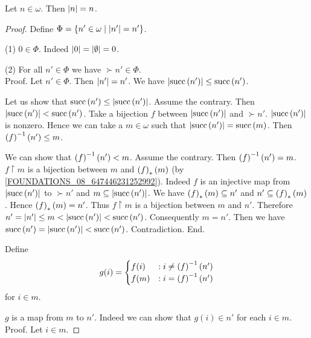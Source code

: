 \documentclass[../set-theory.tex]{subfiles}
\begin{document}
  \begin{forthel}
    \begin{theorem}
      Let $n \in \omega$.
      Then $\left\vert n\right\vert = n$.
    \end{theorem}
    \begin{proof}
      Define $\Phi = \{ n' \in \omega \mid \left\vert n'\right\vert = n' \}$.

      (1) $0 \in \Phi$.
      Indeed $\left\vert0\right\vert = \left\vert\emptyset\right\vert = 0$.

      (2) For all $n' \in \Phi$ we have $\succ{n'} \in \Phi$. \\
      Proof.
        Let $n' \in \Phi$.
        Then $\left\vert n'\right\vert = n'$.
        We have $\left\vert\mathrm{succ}\left(n'\right)\right\vert \leq \mathrm{succ}\left(n'\right)$.

        Let us show that $\mathrm{succ}\left(n'\right) \leq \left\vert\mathrm{succ}\left(n'\right)\right\vert$.
          Assume the contrary.
          Then $\left\vert\mathrm{succ}\left(n'\right)\right\vert < \mathrm{succ}\left(n'\right)$.
          Take a bijection $f$ between $\left\vert\mathrm{succ}\left(n'\right)\right\vert$ and $\succ{n'}$.
          $\left\vert\mathrm{succ}\left(n'\right)\right\vert$ is nonzero.
          Hence we can take a $m \in \omega$ such that $\left\vert\mathrm{succ}\left(n'\right)\right\vert =
          \mathrm{succ}\left(m\right)$.
          Then $\left(f\right)^{-1}(n') \leq m$.

          We can show that $\left(f\right)^{-1}(n') < m$.
            Assume the contrary.
            Then $\left(f\right)^{-1}(n') = m$.
            $f \restriction m$ is a bijection between $m$ and $\left(f\right)_{*}(m)$ (by
            \cref{FOUNDATIONS_08_647446231252992}).
            Indeed $f$ is an injective map from $\left\vert\mathrm{succ}\left(n'\right)\right\vert$ to $\succ{n'}$ and
            $m \subseteq \left\vert\mathrm{succ}\left(n'\right)\right\vert$.
            We have $\left(f\right)_{*}(m) \subseteq n'$ and $n' \subseteq \left(f\right)_{*}(m)$.
            Hence $\left(f\right)_{*}(m) = n'$.
            Thus $f \restriction m$ is a bijection between $m$ and $n'$.
            Therefore $n'
              = \left\vert n'\right\vert
              \leq m
              < \left\vert\mathrm{succ}\left(n'\right)\right\vert
              < \mathrm{succ}\left(n'\right)$.
            Consequently $m = n'$.
            Then we have $\mathrm{succ}\left(n'\right) = \left\vert\mathrm{succ}\left(n'\right)\right\vert < \mathrm{succ}\left(n'\right)$.
            Contradiction.
          End.

          Define \[ g(i) =
            \begin{cases}
              f(i)  & : i \neq \left(f\right)^{-1}(n')
              \\
              f(m)  & : i = \left(f\right)^{-1}(n')
            \end{cases} \]
          for $i \in m$.

          $g$ is a map from $m$ to $n'$.
          Indeed we can show that $g(i) \in n'$ for each $i \in m$. \\
          Proof.
            Let $i \in m$.


\end{proof}
\end{forthel}
\end{document}
